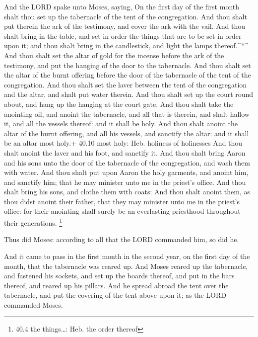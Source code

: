  And the LORD spake unto Moses, saying,  On the
first day of the first month shalt thou set up the tabernacle of the
tent of the congregation.  And thou shalt put therein the
ark of the testimony, and cover the ark with the vail.  And
thou shalt bring in the table, and set in order the things that are to
be set in order upon it; and thou shalt bring in the candlestick, and
light the lamps thereof.\^{}*\^{}  And thou shalt set the
altar of gold for the incense before the ark of the testimony, and put
the hanging of the door to the tabernacle.  And thou shalt
set the altar of the burnt offering before the door of the tabernacle of
the tent of the congregation.  And thou shalt set the laver
between the tent of the congregation and the altar, and shalt put water
therein.  And thou shalt set up the court round about, and
hang up the hanging at the court gate.  And thou shalt take
the anointing oil, and anoint the tabernacle, and all that is therein,
and shalt hallow it, and all the vessels thereof: and it shall be holy.
 And thou shalt anoint the altar of the burnt offering, and
all his vessels, and sanctify the altar: and it shall be an altar most
holy.+ 40.10 most holy: Heb. holiness of holinesses  And
thou shalt anoint the laver and his foot, and sanctify it. 
And thou shalt bring Aaron and his sons unto the door of the tabernacle
of the congregation, and wash them with water.  And thou
shalt put upon Aaron the holy garments, and anoint him, and sanctify
him; that he may minister unto me in the priest's office. 
And thou shalt bring his sons, and clothe them with coats: 
And thou shalt anoint them, as thou didst anoint their father, that they
may minister unto me in the priest's office: for their anointing shall
surely be an everlasting priesthood throughout their generations.
\footnote{40.4 the things\ldots: Heb. the order thereof}

 Thus did Moses: according to all that the LORD commanded
him, so did he.

 And it came to pass in the first month in the second year,
on the first day of the month, that the tabernacle was reared up.
 And Moses reared up the tabernacle, and fastened his
sockets, and set up the boards thereof, and put in the bars thereof, and
reared up his pillars.  And he spread abroad the tent over
the tabernacle, and put the covering of the tent above upon it; as the
LORD commanded Moses.

